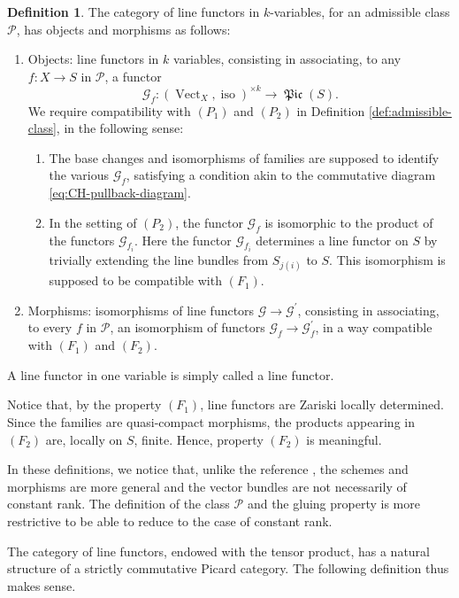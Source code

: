 \documentclass[11pt]{article}
\theoremstyle{plain}
\theoremstyle{definition}
\newtheorem{definition}[theorem]{Definition}
\newcommand{\Gcal}{\mathcal G}
\newcommand{\Pcal}{\mathcal P}
\DeclareMathOperator{\Picfr}{\mathfrak{Pic}}
\DeclareMathOperator{\iso}{iso}
\DeclareMathOperator{\Vect}{Vect}
\begin{document}
\begin{definition}
The category of line functors in $k$-variables, for an admissible class $\Pcal$, has objects and morphisms as follows:
\begin{enumerate}
\item Objects: line functors in $k$ variables, consisting in associating, to any $f\colon X \to S$ in $\Pcal$, a functor
\begin{equation} \label{def:determinantfunctor}
\Gcal_f \colon (\Vect_{X}, \iso)^{\times k} \to \Picfr(S).
\end{equation}
We require compatibility with $(P_1)$ and $(P_2)$ in Definition \ref{def:admissible-class}, in the following sense:
\begin{enumerate}
\item[$(F_1)$] The base changes and isomorphisms of families are supposed to identify the various $\Gcal_{f}$, satisfying a condition akin to the commutative diagram \eqref{eq:CH-pullback-diagram}.
\item[$(F_2)$] In the setting of $(P_2)$, the functor $\Gcal_f$ is isomorphic to the product of the functors $\Gcal_{f_i}$. Here the functor $\Gcal_{f_i}$ determines a line functor on $S$ by trivially extending the line bundles from $S_{j(i)}$ to $S$. This isomorphism is supposed to be compatible with $(F_1)$.
\end{enumerate}
\item Morphisms: isomorphisms of line functors $\Gcal\to\Gcal^{\prime}$, consisting in associating, to every $f$ in $\Pcal$, an isomorphism of functors $\Gcal_{f}\to\Gcal_{f}^{\prime}$, in a way compatible with $(F_{1})$ and $(F_{2})$.
\end{enumerate}
A line functor in one variable is simply called a line functor.
\end{definition}
Notice that, by the property $(F_{1})$, line functors are Zariski locally determined. Since the families are quasi-compact morphisms, the products appearing in $(F_2)$ are, locally on $S$, finite. Hence, property $(F_2)$ is meaningful.

In these definitions, we notice that, unlike the reference \cite{Eriksson-Freixas-Wentworth}, the schemes and morphisms are more general and the vector bundles are not necessarily of constant rank. The definition of the class $\Pcal$ and the gluing property is more restrictive to be able to reduce to the case of constant rank.

The category of line functors, endowed with the tensor product, has a natural structure of a strictly commutative Picard category. The following definition thus makes sense.
\end{document}
